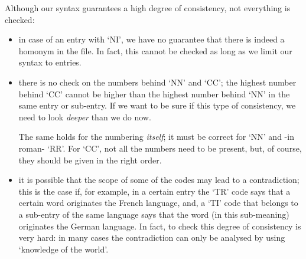 Although our syntax guarantees a high degree of consistency, not everything 
is checked:
\begin{itemize}
  \item in case of an entry with `NI', we have no guarantee that there is
        indeed a homonym in the file. In fact, this cannot be checked
        as long as we limit our syntax to entries.
  \item there is no check on the numbers behind `NN' and `CC'; the highest
        number behind `CC' cannot be higher than the highest number behind
        `NN' in the same entry or sub-entry. If we want to be sure if this type
        of consistency, we need to look {\em deeper} than we do now.
 
        The same holds for the numbering {\em itself}; it must be correct
        for `NN' and -in roman- `RR'. For `CC', not all the numbers need to
        be present, but, of course, they should be given in the right order.

  \item it is possible that the scope of some of the codes may lead to a 
        contradiction; this is the case if, for example, in a certain entry
        the `TR' code says that a certain word originates the French language,
        and, a `TI' code that belongs to a sub-entry of the same language says
        that the word (in this sub-meaning) originates the German language.
        In fact, to check this degree of consistency is very hard: in many
        cases the contradiction can only be analysed by using `knowledge of
        the world'.
\end{itemize}
\newpage
